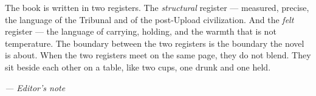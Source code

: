 \bigskip

\noindent The book is written in two registers. The \emph{structural} register — measured, precise, the language of the Tribunal and of the post-Upload civilization. And the \emph{felt} register — the language of carrying, holding, and the warmth that is not temperature. The boundary between the two registers is the boundary the novel is about. When the two registers meet on the same page, they do not blend. They sit beside each other on a table, like two cups, one drunk and one held.

\medskip

\noindent
\hfill{\footnotesize\color{dim}\textit{— Editor's note}}\par
